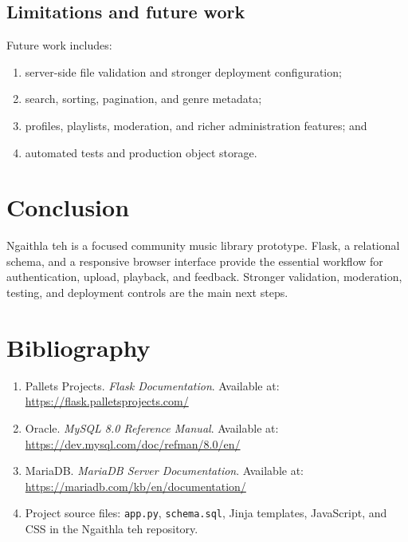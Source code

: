 \documentclass[12pt,a4paper]{article}
\newcommand{\projectname}{Ngaithla teh}
\begin{document}
\subsection{Limitations and future work}
Future work includes:
\begin{enumerate}[leftmargin=*]
  \item server-side file validation and stronger deployment configuration;
  \item search, sorting, pagination, and genre metadata;
  \item profiles, playlists, moderation, and richer administration features; and
  \item automated tests and production object storage.
\end{enumerate}

\clearpage
\section*{Conclusion}
\projectname{} is a focused community music library prototype. Flask, a relational schema, and a responsive browser interface provide the essential workflow for authentication, upload, playback, and feedback. Stronger validation, moderation, testing, and deployment controls are the main next steps.

\clearpage
\section*{Bibliography}
\begin{enumerate}
  \item Pallets Projects. \emph{Flask Documentation}. Available at:
  \url{https://flask.palletsprojects.com/}
  \item Oracle. \emph{MySQL 8.0 Reference Manual}. Available at:
  \url{https://dev.mysql.com/doc/refman/8.0/en/}
  \item MariaDB. \emph{MariaDB Server Documentation}. Available at:
  \url{https://mariadb.com/kb/en/documentation/}
  \item Project source files: \texttt{app.py}, \texttt{schema.sql}, Jinja
  templates, JavaScript, and CSS in the Ngaithla teh repository.
\end{enumerate}
\end{document}
